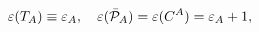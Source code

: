 \begin{equation}\label{3.32a}
\varepsilon(T_{A})\equiv\varepsilon_A,\quad
\varepsilon(\bar{\cal P}_{A})=\varepsilon(C^A)=\varepsilon_A+1,
\end{equation}

